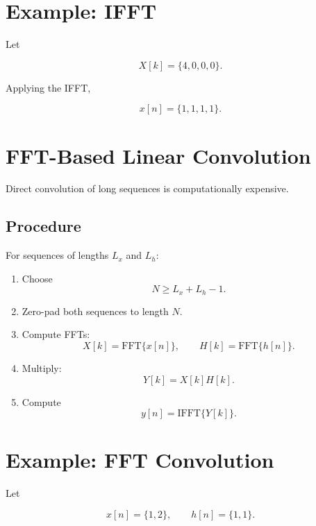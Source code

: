 \section{Example: IFFT}

Let

\[
X[k]=\{4,0,0,0\}.
\]

Applying the IFFT,

\[
x[n]=\{1,1,1,1\}.
\]


\section{FFT-Based Linear Convolution}

Direct convolution of long sequences is computationally expensive.


\subsection{Procedure}

For sequences of lengths \(L_x\) and \(L_h\):

\begin{enumerate}
\item Choose
\[
N\ge L_x+L_h-1.
\]

\item Zero-pad both sequences to length \(N\).

\item Compute FFTs:
\[
X[k]=\text{FFT}\{x[n]\},
\qquad
H[k]=\text{FFT}\{h[n]\}.
\]

\item Multiply:
\[
Y[k]=X[k]H[k].
\]

\item Compute
\[
y[n]=\text{IFFT}\{Y[k]\}.
\]
\end{enumerate}


\section{Example: FFT Convolution}

Let

\[
x[n]=\{1,2\},
\qquad
h[n]=\{1,1\}.
\]

